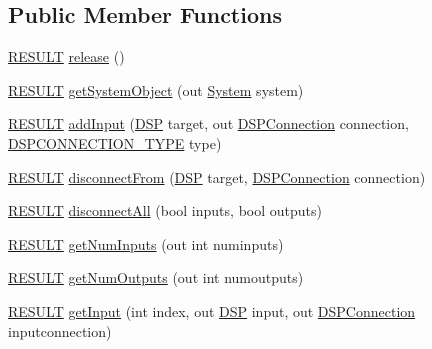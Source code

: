 \subsection*{Public Member Functions}
\begin{DoxyCompactItemize}
\item 
\hyperlink{namespace_f_m_o_d_a305d1176ef3f8c8815861a60407ac33d}{R\+E\+S\+U\+LT} \hyperlink{class_f_m_o_d_1_1_d_s_p_ae40c39c8ab23fe06bdecb96edd8bbe32}{release} ()
\item 
\hyperlink{namespace_f_m_o_d_a305d1176ef3f8c8815861a60407ac33d}{R\+E\+S\+U\+LT} \hyperlink{class_f_m_o_d_1_1_d_s_p_a01c133af7873b83bee48889f2f075bf0}{get\+System\+Object} (out \hyperlink{class_f_m_o_d_1_1_system}{System} system)
\item 
\hyperlink{namespace_f_m_o_d_a305d1176ef3f8c8815861a60407ac33d}{R\+E\+S\+U\+LT} \hyperlink{class_f_m_o_d_1_1_d_s_p_a02a78c19ab1c921028035ec95f6ea653}{add\+Input} (\hyperlink{class_f_m_o_d_1_1_d_s_p}{D\+SP} target, out \hyperlink{class_f_m_o_d_1_1_d_s_p_connection}{D\+S\+P\+Connection} connection, \hyperlink{namespace_f_m_o_d_abd730a6ff8b969c2f90d4123deb42aca}{D\+S\+P\+C\+O\+N\+N\+E\+C\+T\+I\+O\+N\+\_\+\+T\+Y\+PE} type)
\item 
\hyperlink{namespace_f_m_o_d_a305d1176ef3f8c8815861a60407ac33d}{R\+E\+S\+U\+LT} \hyperlink{class_f_m_o_d_1_1_d_s_p_a7de3055ef8036b3c45fe708489fa9091}{disconnect\+From} (\hyperlink{class_f_m_o_d_1_1_d_s_p}{D\+SP} target, \hyperlink{class_f_m_o_d_1_1_d_s_p_connection}{D\+S\+P\+Connection} connection)
\item 
\hyperlink{namespace_f_m_o_d_a305d1176ef3f8c8815861a60407ac33d}{R\+E\+S\+U\+LT} \hyperlink{class_f_m_o_d_1_1_d_s_p_a8b07d66e98e0c959763b746df5422fbb}{disconnect\+All} (bool inputs, bool outputs)
\item 
\hyperlink{namespace_f_m_o_d_a305d1176ef3f8c8815861a60407ac33d}{R\+E\+S\+U\+LT} \hyperlink{class_f_m_o_d_1_1_d_s_p_af26eb2c452f0ef816a6098395e4f0c6d}{get\+Num\+Inputs} (out int numinputs)
\item 
\hyperlink{namespace_f_m_o_d_a305d1176ef3f8c8815861a60407ac33d}{R\+E\+S\+U\+LT} \hyperlink{class_f_m_o_d_1_1_d_s_p_a02296a0f4370041e74d427172750bd76}{get\+Num\+Outputs} (out int numoutputs)
\item 
\hyperlink{namespace_f_m_o_d_a305d1176ef3f8c8815861a60407ac33d}{R\+E\+S\+U\+LT} \hyperlink{class_f_m_o_d_1_1_d_s_p_a9cdc8729a61c64aba4c951b4e175358f}{get\+Input} (int index, out \hyperlink{class_f_m_o_d_1_1_d_s_p}{D\+SP} input, out \hyperlink{class_f_m_o_d_1_1_d_s_p_connection}{D\+S\+P\+Connection} inputconnection)

\end{DoxyCompactItemize}
